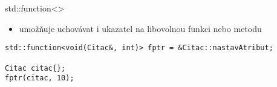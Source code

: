 \begin{frame}[fragile]
\begin{block}{std::function<>}
\begin{itemize}
\item umožňuje uchovávat i ukazatel na libovolnou funkci nebo metodu
\end{itemize}
\end{block}

\begin{yesblock}
\begin{lstlisting}
std::function<void(Citac&, int)> fptr = &Citac::nastavAtribut;
	
Citac citac{};
fptr(citac, 10);

\end{lstlisting}
\end{yesblock}
\end{frame}





